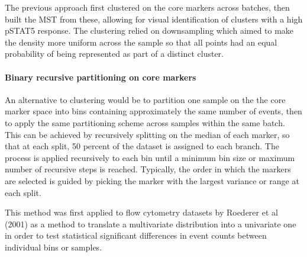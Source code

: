 The previous approach first clustered on the core markers across batches,
then built the \gls{MST} from these, allowing for visual identification of
clusters with a high pSTAT5 response.
The clustering relied on downsampling which aimed to make the density
more uniform across the sample so that all points had an equal probability of being
represented as part of a distinct cluster.

\paragraph{Binary recursive partitioning on core markers}
An alternative to clustering would be to partition one sample on the the core marker
space into bins containing approximately the same number of events,
then to apply the same partitioning scheme across samples within the same batch.
This can be achieved by recursively splitting on the median of each marker,
so that at each split, 50 percent of the dataset is assigned to each branch.
The process is applied recursively to each bin until
a minimum bin size or maximum number of recursive steps is reached.  
Typically, the order in which the markers are selected is guided by picking the marker
with the largest variance or range at each split.

This method was first applied to flow cytometry datasets by Roederer et al (2001) as a method to translate
a multivariate distribution into a univariate one in order to test statistical significant differences in event counts
between individual bins or samples.

